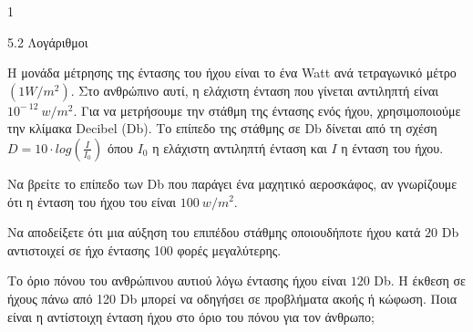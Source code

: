 \begin{ylh}{1}
\item 5.2 Λογάριθμοι
\end{ylh}
Η μονάδα μέτρησης της έντασης του ήχου είναι το ένα Watt ανά τετραγωνικό μέτρο $\left( 1W/m^{2} \right)$. Στο ανθρώπινο αυτί, η ελάχιστη ένταση που γίνεται αντιληπτή είναι $10^{- \ 12}\ w/m^{2}$. Για να μετρήσουμε την στάθμη της έντασης ενός ήχου, χρησιμοποιούμε την κλίμακα Decibel (Db). Το επίπεδο της στάθμης σε Db δίνεται από τη σχέση $D = 10 \cdot log\left( \frac{I}{I_{0}} \right)$ όπου $I_{0}$ η ελάχιστη αντιληπτή ένταση και $I$ η ένταση του ήχου.
\begin{alist}
\item Να βρείτε το επίπεδο των Db που παράγει ένα μαχητικό αεροσκάφος, αν γνωρίζουμε ότι η ένταση του ήχου του είναι $100\ w/m^{2}$.
\item Να αποδείξετε ότι μια αύξηση του επιπέδου στάθμης οποιουδήποτε ήχου κατά $20$ Db αντιστοιχεί σε ήχο έντασης 100 φορές μεγαλύτερης.
\item Το όριο πόνου του ανθρώπινου αυτιού λόγω έντασης ήχου είναι $120$ Db. Η έκθεση σε ήχους πάνω από 120 Db μπορεί να οδηγήσει σε προβλήματα ακοής ή κώφωση. Ποια είναι η αντίστοιχη ένταση ήχου στο όριο του πόνου για τον άνθρωπο;
\end{alist}


